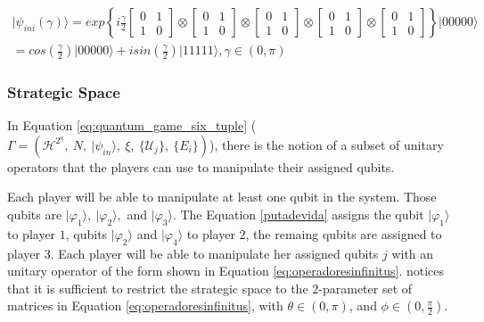 \begin{center}
\begin{equation}
\begin{split}
\vert\psi_{ini}(\gamma)\rangle=exp\left\{ i\frac{\gamma}{2}\left[\begin{array}{cc}
0 & 1\\
1 & 0
\end{array}\right]\otimes\left[\begin{array}{cc}
0 & 1\\
1 & 0
\end{array}\right]\otimes\left[\begin{array}{cc}
0 & 1\\
1 & 0
\end{array}\right]\otimes\left[\begin{array}{cc}
0 & 1\\
1 & 0
\end{array}\right]\otimes\left[\begin{array}{cc}
0 & 1\\
1 & 0
\end{array}\right]\right\} \vert00000\rangle \\
=cos(\frac{\gamma}{2})\vert00000\rangle+isin(\frac{\gamma}{2})\vert11111\rangle,\gamma\in(0,\pi)
\end{split}
\label{eq:estado_inicial_pg}
\end{equation}
\end{center}



\subsubsection{Strategic Space}
\label{subsec:strategic_space}

In Equation \ref{eq:quantum_game_six_tuple} ($\Gamma=(\mathcal{H}^{2^{a}},\: N,\:\vert\psi_{in}\rangle,\:\xi,\:\{\mathcal{U}_{j}\},\:\{E_{i}\})
$), there is the notion of a subset of unitary operators that the players can use to manipulate their assigned qubits. 

Each player will be able to manipulate at least one qubit in the system. Those qubits are $\vert\varphi_{1}\rangle,\:\vert\varphi_{2}\rangle,$ and $\vert\varphi_{3}\rangle$. The Equation \ref{putadevida} assigns the qubit $\vert\varphi_{1}\rangle$ to player $1$, qubits $\vert\varphi_{2}\rangle$ and $\vert\varphi_{4}\rangle$ to player $2$, the remaing qubits are assigned to player $3$. Each player will be able to manipulate her assigned qubits $j$ with an unitary operator of the form shown in Equation \ref{eq:operadoresinfinitus}. \cite{Eisert2008} notices that it is sufficient to restrict the strategic space to the $2$-parameter set of matrices in Equation \ref{eq:operadoresinfinitus}, with $ \theta \in ( 0, \pi )$, and $\phi \in ( 0, \frac{\pi}{2})$.



